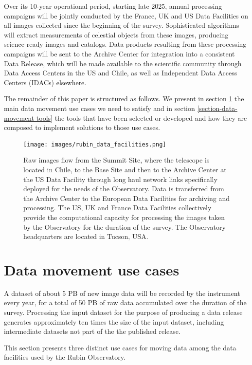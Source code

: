 \documentclass{webofc}
\begin{document}
Over its 10-year operational period, starting late 2025, annual processing campaigns will be jointly conducted by the France, UK and US Data Facilities on all images collected since the beginning of the survey. Sophisticated algorithms will extract measurements of celestial objects from these images, producing science-ready images and catalogs. Data products resulting from these processing campaigns will be sent to the Archive Center for integration into a consistent Data Release, which will be made available to the scientific community through Data Access Centers in the US and Chile, as well as Independent Data Access Centers (IDACs) elsewhere.

The remainder of this paper is structured as follows. We present in section \ref{section-data-movement-use-cases} the main data movement use cases we need to satisfy and in section \ref{section-data-movement-tools} the tools that have been selected or developed and how they are composed to implement solutions to those use cases.

\begin{figure}[h]
\texttt{[image: images/rubin\_data\_facilities.png]}
\caption{Raw images flow from the Summit Site, where the telescope is located in Chile, to the Base Site and then to the Archive Center at the US Data Facility through long haul network links specifically deployed for the needs of the Observatory. Data is transferred from the Archive Center to the European Data Facilities for archiving and processing. The US, UK and France Data Facilities collectively provide the computational capacity for processing the images taken by the Observatory for the duration of the survey. The Observatory headquarters are located in Tucson, USA.}
\label{fig:data-facilities}
\end{figure}

\section{Data movement use cases}
\label{section-data-movement-use-cases}

A dataset of about 5 PB of new image data will be recorded by the instrument every year, for a total of 50 PB of raw data accumulated over the duration of the survey. Processing the input dataset for the purpose of producing a data release generates approximately ten times the size of the input dataset, including intermediate datasets not part of the the published release.

This section presents three distinct use cases for moving data among the data facilities used by the Rubin Observatory.
\end{document}
